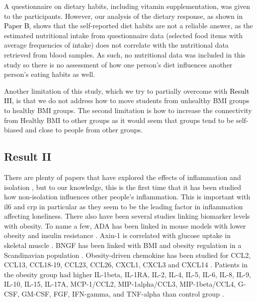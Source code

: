 
A questionnaire on dietary habits, including vitamin supplementation, was given to the participants. However, our analysis of the dietary response, as shown in \colorbox{PaperColor}{\textcolor{black}{Paper B}}, shows that the self-reported diet habits are not a reliable answer, as the estimated nutritional intake from questionnaire data (selected food items with average frequencies of intake) does not correlate with the nutritional data retrieved from blood samples. As such, no nutritional data was included in this study so there is no assessment of how one person's diet influences another person's eating habits as well.

Another limitation of this study, which we try to partially overcome with \colorbox{ResultColor}{\textcolor{black}{Result III}}, is that we do not address how to move students from unhealthy BMI groups to healthy BMI groups. The second limitation is how to increase the connectivity from Healthy BMI to other groups as it would seem that groups tend to be self-biased and close to people from other groups. 




\subsection{Result II}


There are plenty of papers that have explored the effects of inflammation and isolation \cite{Smith2020}, but to our knowledge, this is the first time that it has been studied how non-isolation influences other people's inflammation. This is important with \gls{il6} and \gls{crp} in particular as they seem to be the leading factor in inflammation affecting loneliness. There also have been several studies linking biomarker levels with obesity. To name a few, ADA has been linked in mouse models with lower obesity and insulin resistance \cite{Cui2021}. Axin-1 is correlated with glucose uptake in skeletal muscle \cite{Yue2020}. BNGF has been linked with BMI and obesity regulation in a Scandinavian population \cite{Thorleifsson2008}. Obesity-driven chemokine has been studied for CCL2, CCL13, CCL18-19, CCL23, CCL26, CXCL1, CXCL3 and CXCL14 \cite{Ignacio2016}. Patients in the obesity group had higher IL-1beta, IL-1RA, IL-2, IL-4, IL-5, IL-6, IL-8, IL-9, IL-10, IL-15, IL-17A, MCP-1/CCL2, MIP-1alpha/CCL3, MIP-1beta/CCL4, G-CSF, GM-CSF, FGF, IFN-gamma, and TNF-alpha than control group \cite{vanderZalm2020}.

